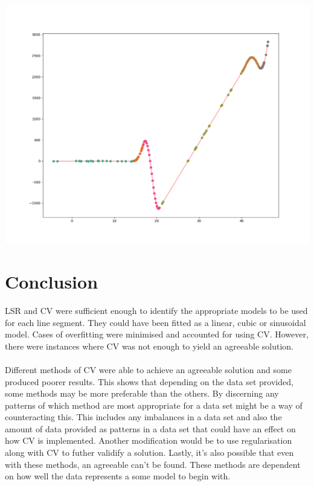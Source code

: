\documentclass[a4paper,11pt]{article}
\begin{document}
\begin{table}[ht!]
\begin{minipage}{0.5\linewidth}
    \includegraphics[width=1\linewidth]{res/adv_3.png}
    \label{fig:adv_3}
    \end{minipage}
\end{table}
\FloatBarrier

\section{Conclusion}
LSR and CV were sufficient enough to identify the appropriate models to be used
for each line segment. They could have been fitted as a linear, cubic or sinusoidal
model. Cases of overfitting were minimised and accounted for using CV. However,
there were instances where CV was not enough to yield an agreeable solution.
\\ \\
Different methods of CV were able to achieve an agreeable solution and some
produced poorer results. This shows that depending on the data set provided, some
methods may be more preferable than the others. By discerning any patterns of which
method are most appropriate for a data set might be a way of counteracting this.
This includes any imbalances in a data set and also the amount of data provided as
patterns in a data set that could have an effect on how CV is implemented. Another
modification would be to use regularisation along with CV to futher validify a
solution. Lastly, it's also possible that even with these methods, an agreeable
can't be found. These methods are dependent on how well the data represents a
some model to begin with.
\end{document}
